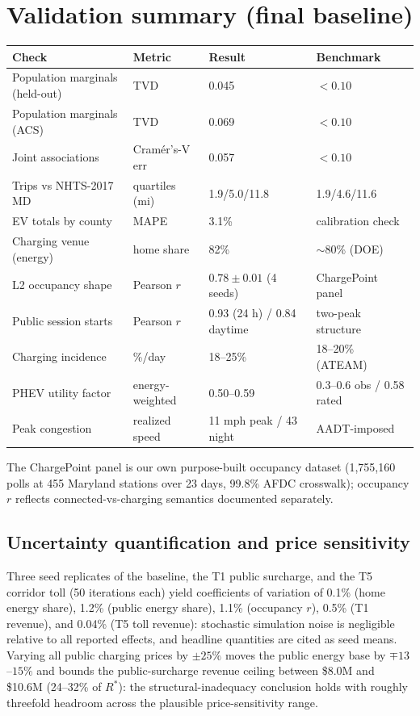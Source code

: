 \documentclass[11pt]{article}
\begin{document}
\section{Validation summary (final baseline)}
\begin{center}\small
\begin{tabular}{llll}
\toprule
Check & Metric & Result & Benchmark \\
\midrule
Population marginals (held-out) & TVD & 0.045 & $<0.10$ \\
Population marginals (ACS) & TVD & 0.069 & $<0.10$ \\
Joint associations & Cram\'er's-V err & 0.057 & $<0.10$ \\
Trips vs NHTS-2017 MD & quartiles (mi) & 1.9/5.0/11.8 & 1.9/4.6/11.6 \\
EV totals by county & MAPE & 3.1\% & calibration check \\
Charging venue (energy) & home share & 82\% & $\sim$80\% (DOE) \\
L2 occupancy shape & Pearson $r$ & $0.78\pm0.01$ (4 seeds) & ChargePoint panel \\
Public session starts & Pearson $r$ & 0.93 (24 h) / 0.84 daytime & two-peak structure \\
Charging incidence & \%/day & 18--25\% & 18--20\% (ATEAM) \\
PHEV utility factor & energy-weighted & 0.50--0.59 & 0.3--0.6 obs / 0.58 rated \\
Peak congestion & realized speed & 11 mph peak / 43 night & AADT-imposed \\
\bottomrule
\end{tabular}
\end{center}
The ChargePoint panel is our own purpose-built occupancy dataset (1{,}755{,}160
polls at 455 Maryland stations over 23 days, 99.8\% AFDC crosswalk); occupancy
$r$ reflects connected-vs-charging semantics documented separately.


\subsection{Uncertainty quantification and price sensitivity}
Three seed replicates of the baseline, the T1 public surcharge, and the T5
corridor toll (50 iterations each) yield coefficients of variation of 0.1\%
(home energy share), 1.2\% (public energy share), 1.1\% (occupancy $r$), 0.5\%
(T1 revenue), and 0.04\% (T5 toll revenue): stochastic simulation noise is
negligible relative to all reported effects, and headline quantities are cited
as seed means. Varying all public charging prices by $\pm 25\%$ moves the public
energy base by $\mp 13$--$15\%$ and bounds the public-surcharge revenue ceiling
between \$8.0M and \$10.6M (24--32\% of $R^{*}$): the structural-inadequacy
conclusion holds with roughly threefold headroom across the plausible
price-sensitivity range.
\end{document}
